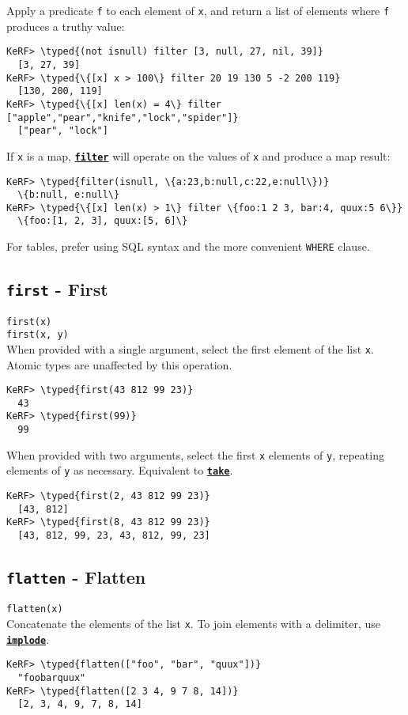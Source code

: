 \documentclass{article}
\newcommand{\typed}[1]{\textcolor{TealBlue}{#1}}
\newcommand{\primdefu}[3]{\subsection{\texttt{#1} - #2}\label{prim:#3}}
\newcommand{\primu}[2]{\hyperref[prim:#2]{\textbf{\texttt{#1}}}}
\newcommand{\primdef}[2]{\primdefu{#1}{#2}{#1}}
\newcommand{\prim}[1]{\primu{#1}{#1}}
\begin{document}
Apply a predicate \texttt{f} to each element of \texttt{x}, and return a list of elements where \texttt{f} produces a truthy value:

\begin{Verbatim}
KeRF> \typed{(not isnull) filter [3, null, 27, nil, 39]}
  [3, 27, 39]
KeRF> \typed{\{[x] x > 100\} filter 20 19 130 5 -2 200 119}
  [130, 200, 119]
KeRF> \typed{\{[x] len(x) = 4\} filter ["apple","pear","knife","lock","spider"]}
  ["pear", "lock"]
\end{Verbatim}

If \texttt{x} is a map, \prim{filter} will operate on the values of \texttt{x} and produce a map result:
\begin{Verbatim}
KeRF> \typed{filter(isnull, \{a:23,b:null,c:22,e:null\})}
  \{b:null, e:null\}
KeRF> \typed{\{[x] len(x) > 1\} filter \{foo:1 2 3, bar:4, quux:5 6\}}
  \{foo:[1, 2, 3], quux:[5, 6]\}
\end{Verbatim}

For tables, prefer using SQL syntax and the more convenient \texttt{WHERE} clause.

\pagebreak
\primdef{first}{First}
\texttt{first(x)}\\
\texttt{first(x, y)}\\

When provided with a single argument, select the first element of the list \texttt{x}. Atomic types are unaffected by this operation.
\begin{Verbatim}
KeRF> \typed{first(43 812 99 23)}
  43
KeRF> \typed{first(99)}
  99
\end{Verbatim}

When provided with two arguments, select the first \texttt{x} elements of \texttt{y}, repeating elements of \texttt{y} as necessary. Equivalent to \prim{take}.
\begin{Verbatim}
KeRF> \typed{first(2, 43 812 99 23)}
  [43, 812]
KeRF> \typed{first(8, 43 812 99 23)}
  [43, 812, 99, 23, 43, 812, 99, 23]
\end{Verbatim}

\primdef{flatten}{Flatten}
\texttt{flatten(x)}\\

Concatenate the elements of the list \texttt{x}. To join elements with a delimiter, use \prim{implode}.
\begin{Verbatim}
KeRF> \typed{flatten(["foo", "bar", "quux"])}
  "foobarquux"
KeRF> \typed{flatten([2 3 4, 9 7 8, 14])}
  [2, 3, 4, 9, 7, 8, 14]
\end{Verbatim}
\end{document}
